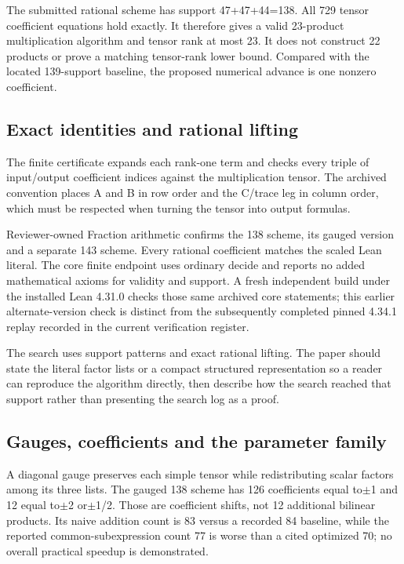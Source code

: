 \documentclass[11pt,a4paper]{article}
\begin{document}
The submitted rational scheme has support 47+47+44=138. All 729 tensor coefficient equations hold exactly. It therefore gives a valid 23-product multiplication algorithm and tensor rank at most 23. It does not construct 22 products or prove a matching tensor-rank lower bound. Compared with the located 139-support baseline, the proposed numerical advance is one nonzero coefficient.

\subsection{Exact identities and rational lifting}
The finite certificate expands each rank-one term and checks every triple of input/output coefficient indices against the multiplication tensor. The archived convention places A and B in row order and the C/trace leg in column order, which must be respected when turning the tensor into output formulas.

Reviewer-owned Fraction arithmetic confirms the 138 scheme, its gauged version and a separate 143 scheme. Every rational coefficient matches the scaled Lean literal. The core finite endpoint uses ordinary decide and reports no added mathematical axioms for validity and support. A fresh independent build under the installed Lean 4.31.0 checks those same archived core statements; this earlier alternate-version check is distinct from the subsequently completed pinned 4.34.1 replay recorded in the current verification register.

The search uses support patterns and exact rational lifting. The paper should state the literal factor lists or a compact structured representation so a reader can reproduce the algorithm directly, then describe how the search reached that support rather than presenting the search log as a proof.

\subsection{Gauges, coefficients and the parameter family}
A diagonal gauge preserves each simple tensor while redistributing scalar factors among its three lists. The gauged 138 scheme has 126 coefficients equal to\ensuremath{\pm}1 and 12 equal to\ensuremath{\pm}2 or\ensuremath{\pm}1/2. Those are coefficient shifts, not 12 additional bilinear products. Its naive addition count is 83 versus a recorded 84 baseline, while the reported common-subexpression count 77 is worse than a cited optimized 70; no overall practical speedup is demonstrated.
\end{document}
